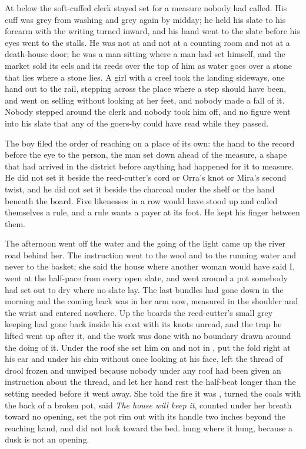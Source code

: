 \scenebreak

At  below  the soft-cuffed clerk stayed set for a measure nobody had called. His cuff was grey from washing and grey again by midday; he held his slate to his forearm with the writing turned inward, and his hand went to the slate before his eyes went to the stalls. He was not at  and not at a counting room and not at a death-house door; he was a man sitting where a man had set himself, and the market sold its eels and its reeds over the top of him as water goes over a stone that lies where a stone lies. A girl with a creel took the landing sideways, one hand out to the rail, stepping across the place where a step should have been, and went on selling without looking at her feet, and nobody made a fall of it. Nobody stepped around the clerk and nobody took him off, and no figure went into his slate that any of the goers-by could have read while they passed.

The boy filed the order of reaching on a place of its own: the hand to the record before the eye to the person, the man set down ahead of the measure, a shape that had arrived in the district before anything had happened for it to measure. He did not set it beside the reed-cutter's cord or Orra's knot or Mira's second twist, and he did not set it beside the charcoal under the shelf or the hand beneath the board. Five likenesses in a row would have stood up and called themselves a rule, and a rule wants a payer at its foot. He kept his finger between them.

\scenebreak

The afternoon went off the water and the going of the light came up the river road behind her. The instruction went to the wool and to the running water and never to the basket; she said the house where another woman would have said I, went at the half-pace from every open slate, and went around a pot somebody had set out to dry where no slate lay. The last bundles had gone down in the morning and the coming back was in her arm now, measured in the shoulder and the wrist and entered nowhere. Up the boards the reed-cutter's small grey keeping had gone back inside his coat with its knots unread, and the trap he lifted went up after it, and the work was done with no boundary drawn around the doing of it. Under the  roof she set him on  and not in , put the fold right at his ear and under his chin without once looking at his face, left the thread of drool frozen and unwiped because nobody under any roof had been given an instruction about the thread, and let her hand rest the half-beat longer than the setting needed before it went away. She told the fire it was , turned the coals with the back of a broken pot, said \emph{The house will keep it}, counted under her breath toward no opening, set the pot rim out with its handle two inches beyond the reaching hand, and did not look toward the bed.  hung where it hung, because a dusk is not an opening.

